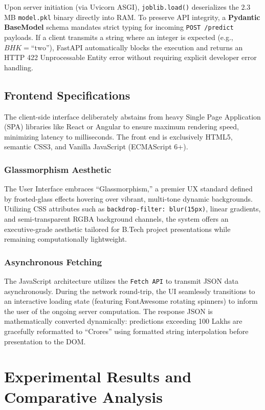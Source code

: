 \documentclass[conference]{IEEEtran}
\begin{document}
Upon server initiation (via Uvicorn ASGI), \texttt{joblib.load()} deserializes the $2.3$ MB \texttt{model.pkl} binary directly into RAM. To preserve API integrity, a \textbf{Pydantic BaseModel} schema mandates strict typing for incoming \texttt{POST /predict} payloads. If a client transmits a string where an integer is expected (e.g., $BHK=\text{``two''}$), FastAPI automatically blocks the execution and returns an HTTP 422 Unprocessable Entity error without requiring explicit developer error handling.

\subsection{Frontend Specifications}
The client-side interface deliberately abstains from heavy Single Page Application (SPA) libraries like React or Angular to ensure maximum rendering speed, minimizing latency to milliseconds. The front end is exclusively HTML5, semantic CSS3, and Vanilla JavaScript (ECMAScript 6+).

\subsubsection{Glassmorphism Aesthetic}
The User Interface embraces ``Glassmorphism,'' a premier UX standard defined by frosted-glass effects hovering over vibrant, multi-tone dynamic backgrounds. Utilizing CSS attributes such as \texttt{backdrop-filter: blur(15px)}, linear gradients, and semi-transparent RGBA background channels, the system offers an executive-grade aesthetic tailored for B.Tech project presentations while remaining computationally lightweight.

\subsubsection{Asynchronous Fetching}
The JavaScript architecture utilizes the \texttt{Fetch API} to transmit JSON data asynchronously. During the network round-trip, the UI seamlessly transitions to an interactive loading state (featuring FontAwesome rotating spinners) to inform the user of the ongoing server computation. The response JSON is mathematically converted dynamically: predictions exceeding 100 Lakhs are gracefully reformatted to ``Crores'' using formatted string interpolation before presentation to the DOM.

\section{Experimental Results and Comparative Analysis}
\end{document}
